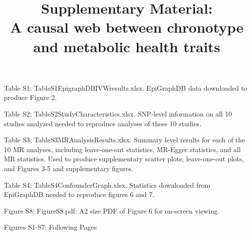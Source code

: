 \documentclass{article}
\title{{\bf Supplementary Material:} \\A causal web between chronotype and metabolic health traits}
\author{}
\date{}
\newcommand{\beginsupplement}{%
        \setcounter{table}{0}
        \renewcommand{\thetable}{S\arabic{table}}%
        \setcounter{figure}{0}
        \renewcommand{\thefigure}{S\arabic{figure}}%
     }
\begin{document}
\maketitle
\beginsupplement

Table S1: TableS1EpigraphDBIVWresults.xlsx. EpiGraphDB data downloaded to produce Figure 2.

Table S2: TableS2StudyCharacteristics.xlsx.
SNP-level information on all 10 studies analyzed needed to reproduce analyses of these 10 studies.

Table S3: TableS3MRAnalysisResults.xlsx. Summary level results for each of the 10 MR analyses, including leave-one-out statistics, MR-Egger statistics, and all MR statistics. Used to produce supplementary scatter plots, leave-one-out plots, and Figures 3-5 and supplementary figures. 

Table S4: TableS4ConfounderGraph.xlsx.
Statistics downloaded from EpiGraphDB needed to reproduce figures 6 and 7.

Figure S8: FigureS8.pdf: A2 size PDF of Figure 6 for on-screen viewing.

Figures S1-S7: Following Pages
 
\end{document}
